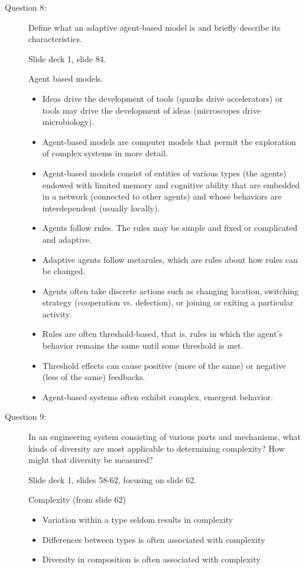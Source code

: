 \documentclass[letterpaper,10pt]{article}
\begin{document}
\begin{description}

\item[Question 8:]
Define what an adaptive agent-based model is and briefly describe its characteristics.

Slide deck 1, slide 84.

Agent based models.
\begin{itemize}
  \item Ideas drive the development of tools (quarks drive accelerators) or tools may drive the development of ideas (microscopes drive microbiology).
  \item Agent-based models are computer models that permit the exploration of complex systems in more detail.
  \item Agent-based models consist of entities of various types (the agents) endowed with limited memory and cognitive ability that are embedded in a network (connected to other agents) and whose behaviors are interdependent (usually locally).
  \item Agents follow rules.  The rules may be simple and fixed or complicated and adaptive.
  \item Adaptive agents follow metarules, which are rules about how rules can be changed.
  \item Agents often take discrete actions such as changing location, switching strategy (cooperation vs. defection), or joining or exiting a particular activity.
  \item Rules are often threshold-based, that is, rules in which the agent’s behavior remains the same until some threshold is met.
  \item Threshold effects can cause positive (more of the same) or negative (less of the same) feedbacks.
  \item Agent-based systems often exhibit complex, emergent behavior.
\end{itemize}

\item[Question 9:]
In an engineering system consisting of various parts and mechanisms, what kinds of diversity are most applicable to determining complexity?  How might that diversity be measured?

Slide deck 1, slides 58-62, focusing on slide 62.

Complexity (from slide 62)
\begin{itemize}
  \item Variation within a type seldom results in complexity
  \item Differences between types is often associated with complexity
  \item Diversity in composition is often associated with complexity
\end{itemize}


\end{description}
\end{document}
